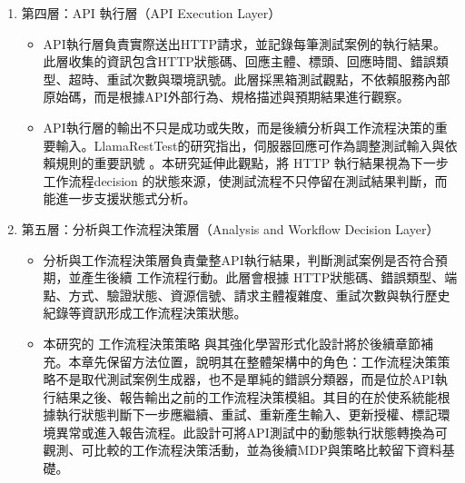 \begin{ZhChapter}
\begin{enumerate}
\begin{itemize}
    \item 因此，本研究將測試案例生成與測試程式生成分開處理。測試案例生成層負責決定「要測什麼」，測試程式生成層負責決定「如何轉換成可執行請求」。此分離可避免LLM直接產生不可執行或缺乏上下文的測試程式，也有助於後續評估程式可執行率。既有LLM軟體測試研究亦指出，大型語言模型在測試生成上具有潛力，但仍需要工具、結構化流程與執行回饋來提升可執行性與可靠性 \parencite{Wang2024Software, Anonymous2023LLMGenerators}。
  \end{itemize}
  \item 第四層：API 執行層（API Execution Layer）
  \begin{itemize}
    \item API執行層負責實際送出HTTP請求，並記錄每筆測試案例的執行結果。此層收集的資訊包含HTTP狀態碼、回應主體、標頭、回應時間、錯誤類型、超時、重試次數與環境訊號。此層採黑箱測試觀點，不依賴服務內部原始碼，而是根據API外部行為、規格描述與預期結果進行觀察。
    \item API執行層的輸出不只是成功或失敗，而是後續分析與工作流程決策的重要輸入。LlamaRestTest的研究指出，伺服器回應可作為調整測試輸入與依賴規則的重要訊號 \parencite{Kim2025LlamaRestTest}。本研究延伸此觀點，將 HTTP 執行結果視為下一步工作流程decision 的狀態來源，使測試流程不只停留在測試結果判斷，而能進一步支援狀態式分析。
  \end{itemize}
  \item 第五層：分析與工作流程決策層（Analysis and Workflow Decision Layer）
  \begin{itemize}
    \item 分析與工作流程決策層負責彙整API執行結果，判斷測試案例是否符合預期，並產生後續 工作流程行動。此層會根據 HTTP狀態碼、錯誤類型、端點、方式、驗證狀態、資源信號、請求主體複雜度、重試次數與執行歷史紀錄等資訊形成工作流程決策狀態。
    \item 本研究的 工作流程決策策略 與其強化學習形式化設計將於後續章節補充。本章先保留方法位置，說明其在整體架構中的角色：工作流程決策策略不是取代測試案例生成器，也不是單純的錯誤分類器，而是位於API執行結果之後、報告輸出之前的工作流程決策模組。其目的在於使系統能根據執行狀態判斷下一步應繼續、重試、重新產生輸入、更新授權、標記環境異常或進入報告流程。此設計可將API測試中的動態執行狀態轉換為可觀測、可比較的工作流程決策活動，並為後續MDP與策略比較留下資料基礎。
  \end{itemize}
\end{enumerate}


\end{ZhChapter}
